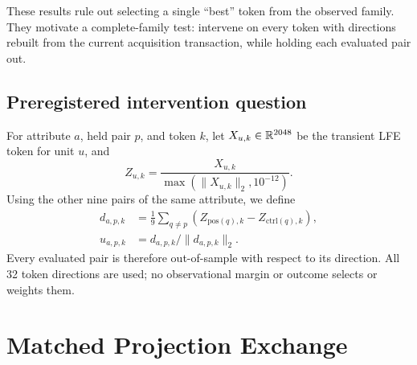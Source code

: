 \documentclass[10pt,twocolumn,letterpaper]{article}
\begin{document}
\begin{table}[t]
\centering
\caption{Closed evidence windows.  Each row has a deliberately bounded inference.}
\label{tab:ladder}
\end{table}

These results rule out selecting a single ``best'' token from the observed family.  They motivate a complete-family test: intervene on every token with directions rebuilt from the current acquisition transaction, while holding each evaluated pair out.

\subsection{Preregistered intervention question}

For attribute $a$, held pair $p$, and token $k$, let $X_{u,k}\in\mathbb{R}^{2048}$ be the transient LFE token for unit $u$, and
\begin{equation}
 Z_{u,k}=\frac{X_{u,k}}{\max(\lVert X_{u,k}\rVert_2,10^{-12})}.
\end{equation}
Using the other nine pairs of the same attribute, we define
\begin{align}
 d_{a,p,k} &= \frac{1}{9}\sum_{q\ne p}\left(Z_{\mathrm{pos}(q),k}-Z_{\mathrm{ctrl}(q),k}\right),\\
 u_{a,p,k} &= d_{a,p,k}/\lVert d_{a,p,k}\rVert_2.
\end{align}
Every evaluated pair is therefore out-of-sample with respect to its direction.  All 32 token directions are used; no observational margin or outcome selects or weights them.

\section{Matched Projection Exchange}
\label{sec:intervention}
\end{document}
